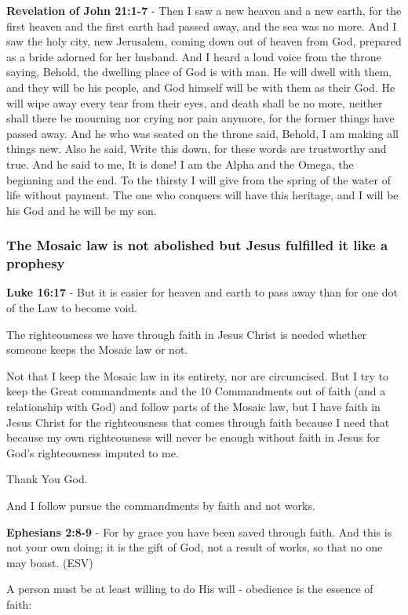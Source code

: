 \documentclass[11pt]{article}
\begin{document}
\textbf{Revelation of John 21:1-7} - Then I saw a new heaven and a new earth, for the first heaven and the first earth had passed away, and the sea was no more. And I saw the holy city, new Jerusalem, coming down out of heaven from God, prepared as a bride adorned for her husband. And I heard a loud voice from the throne saying, Behold, the dwelling place of God is with man. He will dwell with them, and they will be his people, and God himself will be with them as their God. He will wipe away every tear from their eyes, and death shall be no more, neither shall there be mourning nor crying nor pain anymore, for the former things have passed away. And he who was seated on the throne said, Behold, I am making all things new. Also he said, Write this down, for these words are trustworthy and true. And he said to me, It is done! I am the Alpha and the Omega, the beginning and the end. To the thirsty I will give from the spring of the water of life without payment. The one who conquers will have this heritage, and I will be his God and he will be my son.

\subsubsection{The Mosaic law is not abolished but Jesus fulfilled it like a prophesy}
\label{sec:orgba48b0d}
\textbf{Luke 16:17} - But it is easier for heaven and earth to pass away than for one dot of the Law to become void.

The righteousness we have through faith in Jesus Christ is needed whether someone keeps the Mosaic law or not.

Not that I keep the Mosaic law in its entirety, nor are circumcised. But I try to keep the Great commandments
and the 10 Commandments out of faith (and a relationship with God) and follow parts of the Mosaic law,
but I have faith in Jesus Christ for the righteousness that comes through faith because I need that because my own
righteousness will never be enough without faith in Jesus for God's righteousness imputed to me.

Thank You God.

And I follow pursue the commandments by faith and not works.

\textbf{Ephesians 2:8-9} - For by grace you have been saved through faith. And this is not your own doing; it is the gift of God, not a result of works, so that no one may boast. (ESV)

A person must be at least willing to do His will - obedience is the essence of faith:
\end{document}
